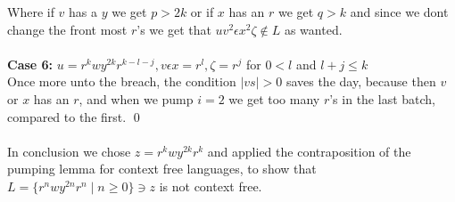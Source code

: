 \documentclass{article}
\theoremstyle{remark}
\numberwithin{equation}{section}
\begin{document}
Where if $v$ has a $y$ we get $p>2k$ or if $x$ has an $r$ we get $q>k$ and since we dont change the front most $r$'s we get that $uv^2\epsilon x^2\zeta\notin L$ as wanted.\\
\\\textbf{Case 6:} $u = r^{k}wy^{2k}r^{k-l-j}, v\epsilon x = r^l, \zeta = r^{j}$ for $0<l$ and $l+j\leq k$\\
Once more unto the breach, the condition $|vs|>0$ saves the day, because then $v$ or $x$ has an $r$, and when we pump $i=2$ we get too many $r$'s in the last batch, compared to the first. \qed\\
\\In conclusion we chose $z = r^kwy^{2k}r^k$ and applied the contraposition of the pumping lemma for context free languages, to show that $L=\{ r^n w y^{2n} r^n \mid n\geq 0 \}\ni z$ is not context free.
\end{document}
